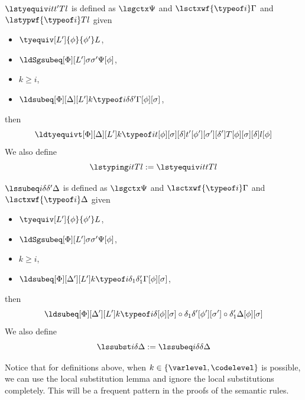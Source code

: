 $\lstyequiv i t{t'}T l$ is defined as $\lsgctx \Psi$ and $\lsctxwf{\typeof i} \Gamma$ and
$\lstypwf{\typeof i} T l$ given
\begin{itemize}
\item $\tyequiv[L']{\phi}{\phi'}L$, 
\item $\ldSgsubeq[\Phi][L'] \sigma{\sigma'}{\Psi[\phi]}$, 
\item $k \ge i$,
\item $\ldsubeq[\Phi][\Delta][L'] k{\typeof i} \delta{\delta'}{\Gamma[\phi][\sigma]}$, 
\end{itemize}
then
\[
  \ldtyequivt[\Phi][\Delta][L']k{\typeof i}{t[\phi][\sigma][\delta]}{t'[\phi'][\sigma'][\delta']}{T[\phi][\sigma][\delta]}{l[\phi]}
\]
We also define
\[
  \lstyping i t T l := \lstyequiv i t{t}T l
\]

$\lssubeq i \delta{\delta'}{\Delta}$ is defined as $\lsgctx \Psi$ and
$\lsctxwf{\typeof i} \Gamma$ and $\lsctxwf{\typeof i} \Delta$ given
\begin{itemize}
\item $\tyequiv[L']{\phi}{\phi'}L$, 
\item $\ldSgsubeq[\Phi][L'] \sigma{\sigma'}{\Psi[\phi]}$, 
\item $k \ge i$,
\item $\ldsubeq[\Phi][\Delta'][L'] k{\typeof i} {\delta_1}{\delta_1'}{\Gamma[\phi][\sigma]}$, 
\end{itemize}
then
\[
  \ldsubeq[\Phi][\Delta'][L'] k{\typeof i}{\delta[\phi][\sigma] \circ \delta_1}{\delta'[\phi'][\sigma'] \circ \delta_1'}{\Delta[\phi][\sigma]}
\]
We also define
\[
  \lssubst i \delta{\Delta} := \lssubeq i \delta{\delta}{\Delta}
\]

Notice that for definitions above, when $k \in \{\varlevel, \codelevel \}$ is possible, we can use the
local substitution lemma and ignore the local substitutions completely. %
This will be a frequent pattern in the proofs of the semantic rules. 


